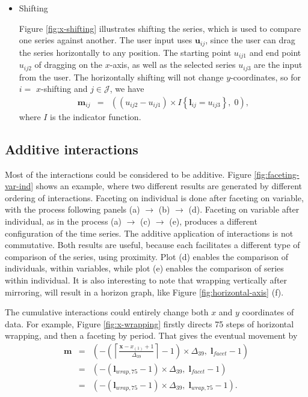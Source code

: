 \documentclass[12pt]{article}
\begin{document}
\begin{itemize}
\item Shifting 

Figure \ref{fig:x-shifting} illustrates shifting the series, which is used to compare one series against another. The user input uses $\mathbf{u}{}_{ij}$, since the user can drag the
series horizontally to any position. The starting point
$u_{ij1}$ and end point $u_{ij2}$ of dragging on the $x$-axis,
as well as the selected series $u_{ij3}$ are the input from the user.
The horizontally shifting will not change $y$-coordinates, so for
$i=$ $x$-shifting and $j\in\mathcal{J}$, we have
\begin{eqnarray*}
\mathbf{m}{}_{ij} & = & 
((u_{ij2}-u_{ij1})\times I\left\{ \mathbf{l}{}_{ij}=u_{ij3}\right\}, \; 0),
\end{eqnarray*}
where $I$ is the indicator function.

\end{itemize}

\subsection{Additive interactions\label{interaction-addition}}

Most of the interactions could be considered to be additive.
Figure \ref{fig:faceting-var-ind} shows an example, where two
different results are generated by different ordering of interactions.
Faceting on individual is done after faceting on variable, with the
process following panels (a) $\rightarrow$ (b) $\rightarrow$ (d).
Faceting on variable after individual, as in the process (a)
$\rightarrow$ (c) $\rightarrow$ (e), produces a different
configuration of the time series. The additive application of
interactions is not commutative. Both results are useful, because
each facilitates a different type of comparison of the series,
using proximity. Plot (d) enables the comparison of individuals,
within variables, while plot (e) enables the comparison of series
within individual. It is also interesting to
note that wrapping vertically after mirroring, will result in
a horizon graph, like Figure \ref{fig:horizontal-axis} (f).

The cumulative interactions could
entirely change both $x$ and $y$ coordinates of data.
For example, Figure \ref{fig:x-wrapping} firstly directs
75 steps of horizontal wrapping, and then a faceting by
period. That gives the eventual movement by
\begin{eqnarray*}
\mathbf{m} & = & (-\left(\left\lceil \frac{\mathbf{x}-x_{(1)}+1}{\Delta_{39}}\right\rceil -1\right)\times\Delta_{39}, \; \mathbf{l}{}_{facet}-1) \\
& = & (-(\mathbf{l}{}_{wrap,75} -1)\times\Delta_{39}, \; \mathbf{l}{}_{facet}-1) \\
& = & (-(\mathbf{l}{}_{wrap,75} -1)\times\Delta_{39}, \; \mathbf{l}{}_{wrap,75}-1).
\end{eqnarray*}
\end{document}
